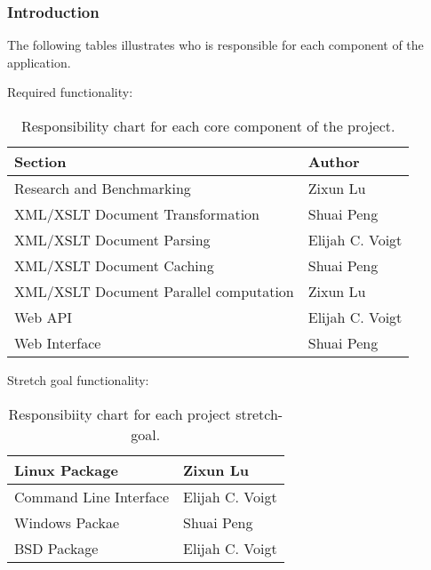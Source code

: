 \subsubsection{Introduction}

The following tables illustrates who is responsible for each component of the application.

Required functionality:

\begin{table}[H]
  \begin{center}
      \begin{tabular}{ | l | p{10cm} |}
      \hline
      Section & Author \\ \hline
      Research and Benchmarking & Zixun Lu \\ \hline
      XML/XSLT Document Transformation & Shuai Peng \\ \hline
      XML/XSLT Document Parsing & Elijah C. Voigt \\ \hline
      XML/XSLT Document Caching & Shuai Peng \\ \hline
      XML/XSLT Document Parallel computation & Zixun Lu \\ \hline
      Web API & Elijah C. Voigt \\ \hline
      Web Interface & Shuai Peng \\ \hline
      \end{tabular}
  \end{center}
  \caption{Responsibility chart for each core component of the project.}
\end{table}

Stretch goal functionality:

\begin{table}[H]
  \begin{center}
      \begin{tabular}{ | l | p{10cm} |}
      \hline
      Linux Package & Zixun Lu \\ \hline
      Command Line Interface& Elijah C. Voigt \\ \hline
      Windows Packae & Shuai Peng \\ \hline
      BSD Package & Elijah C. Voigt \\ \hline
      \end{tabular}
  \end{center}
  \caption{Responsibiity chart for each project stretch-goal.}
\end{table}

\tableofcontents

\clearpage


\newpage

\printbibliography

